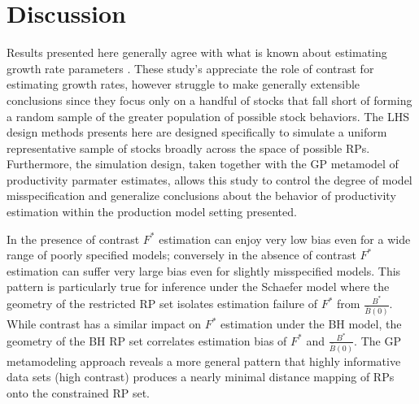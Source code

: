 \documentclass[12pt]{article}
\begin{document}
%
\section{Discussion}


%
Results presented here generally agree with what is known about estimating
growth rate parameters .
These study's appreciate the role of contrast for estimating growth rates, 
however struggle to make generally extensible conclusions since they focus only 
on a handful of stocks that fall short of forming a random sample of the greater 
population of possible stock behaviors. The LHS design methods presents here are 
designed specifically to simulate a uniform representative sample of stocks broadly 
across the space of possible RPs. Furthermore, the simulation design, taken together 
with the GP metamodel of productivity parmater estimates, allows this study to control 
the degree of model misspecification and generalize conclusions about the behavior 
of productivity estimation within the production model setting presented. 


%
In the presence of contrast $F^*$ estimation can enjoy very low bias even
for a wide range of poorly specified models; conversely in the absence of contrast
$F^*$ estimation can suffer very large bias even for slightly misspecified models.
This pattern is particularly true for inference under the Schaefer model where the 
geometry of the restricted RP set isolates estimation failure of $F^*$ from 
$\frac{B^*}{\bar B(0)}$. While contrast has a similar impact on $F^*$ estimation 
under the BH model, the geometry of the BH RP set correlates estimation bias 
of $F^*$ and $\frac{B^*}{\bar B(0)}$. The GP metamodeling approach reveals a 
more general pattern that highly informative data sets (high contrast) 
produces a nearly minimal distance mapping of RPs %
onto the constrained RP set.
\end{document}
